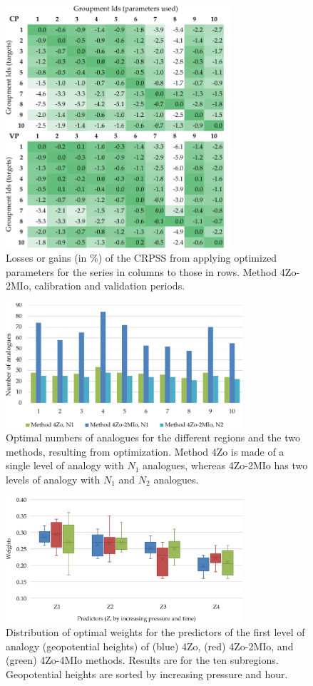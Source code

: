 \documentclass[review]{elsarticle}
\begin{document}
\begin{figure}[t]
	\centerline{\includegraphics[width=8.4cm]{figures/fig08.pdf}}
	\caption{Losses or gains (in \%) of the CRPSS from applying optimized parameters for the series in columns to those in rows. Method 4Zo-2MIo, calibration and validation periods.}
	\label{fig:crossing_4Zo-2MIo}
\end{figure}

\begin{figure}[t]
	\centerline{\includegraphics[width=8.8cm]{figures/fig09.pdf}}
	\caption{Optimal numbers of analogues for the different regions and the two methods, resulting from optimization. Method 4Zo is made of a single level of analogy with $N_{1}$ analogues, whereas 4Zo-2MIo has two levels of analogy with $N_{1}$ and $N_{2}$ analogues.}
	\label{fig:figure_nb_analogs}
\end{figure}

\begin{figure}[t]
	\centerline{\includegraphics[width=8.8cm]{figures/fig10.pdf}}
	\caption{Distribution of optimal weights for the predictors of the first level of analogy (geopotential heights) of (blue) 4Zo, (red) 4Zo-2MIo, and (green) 4Zo-4MIo methods. Results are for the ten subregions. Geopotential heights are sorted by increasing pressure and hour.}
	\label{fig:levels_weights_average}
\end{figure}
\end{document}
